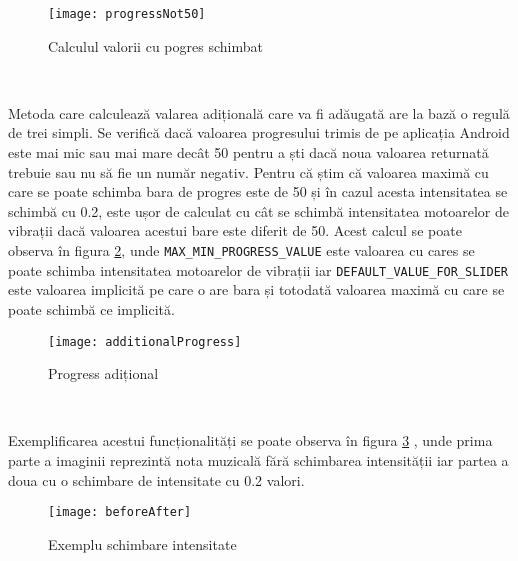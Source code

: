 \documentclass[../IoMusT.tex]{subfiles}
\begin{document}
\begin{figure}[h]
\centering
\texttt{[image: progressNot50]}
\caption{Calculul valorii cu pogres schimbat}
\label{fig:not50}
\end{figure} 
\\
\par Metoda care calculează valarea adițională care va fi adăugată are la bază o regulă de trei simpli. Se verifică dacă valoarea progresului trimis de pe aplicația Android este mai mic sau mai mare decât 50 pentru a ști dacă noua valoarea returnată trebuie sau nu să fie un număr negativ. Pentru că știm că valoarea maximă cu care se poate schimba bara de progres este de 50 și în cazul acesta intensitatea se schimbă cu 0.2, este ușor de calculat cu cât se schimbă intensitatea motoarelor de vibrații dacă valoarea acestui bare este diferit de 50.
Acest calcul se poate observa în figura \ref{fig:additionalProgress}, unde \verb|MAX_MIN_PROGRESS_VALUE| este valoarea cu cares se poate schimba intensitatea motoarelor de vibrații iar \verb|DEFAULT_VALUE_FOR_SLIDER| este valoarea implicită pe care o are bara și totodată valoarea maximă cu care se poate schimbă ce implicită.
\begin{figure}[h]
\centering
\texttt{[image: additionalProgress]}
\caption{Progress adițional}
\label{fig:additionalProgress}
\end{figure} 
\\
\par Exemplificarea acestui funcționalități se poate observa în figura \ref{fig:beforeAfter} , unde prima parte a imaginii reprezintă nota muzicală fără schimbarea intensității iar partea a doua cu o schimbare de intensitate cu 0.2 valori.
\begin{figure}[h]
\centering
\texttt{[image: beforeAfter]}
\caption{Exemplu schimbare intensitate}
\label{fig:beforeAfter}
\end{figure} 
\end{document}
